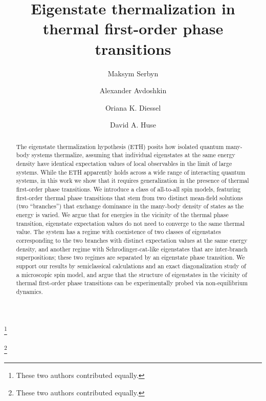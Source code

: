 \documentclass[aps,prx,showpacs,amsmath,amssymb,superscriptaddress,twocolumn,longbibliography,10pt,nofootinbib]{revtex4-2}
\begin{document}
  \title{Eigenstate thermalization in thermal first-order phase transitions}  
  \author{Maksym Serbyn}
  \thanks{These two authors contributed equally.}
\author{Alexander Avdoshkin}
\thanks{These two authors contributed equally.}
\author{Oriana K. Diessel}
\author{David A. Huse}
   \begin{abstract}
The eigenstate thermalization hypothesis (ETH) posits how isolated quantum many-body systems thermalize, assuming that individual eigenstates at the same energy density have identical expectation values of local observables in the limit of large systems. While the ETH apparently holds across a wide range of interacting quantum systems, in this work we show that it requires generalization in the presence of thermal first-order phase transitions. We introduce a class of all-to-all spin models, featuring first-order thermal phase transitions that stem from two distinct mean-field solutions (two ``branches'') that exchange dominance in the many-body density of states as the energy is varied.  We argue that for energies in the vicinity of the thermal phase transition, eigenstate expectation values do not need to converge to the same thermal value.  The system has a regime with coexistence of two classes of eigenstates corresponding to the two branches with distinct expectation values at the same energy density, and another regime with Schrodinger-cat-like eigenstates that are inter-branch superpositions; these two regimes are separated by an eigenstate phase transition. We support our results by semiclassical calculations and an exact diagonalization study of a microscopic spin model, and  argue that the structure of eigenstates in the vicinity of thermal first-order phase transitions can be experimentally probed via non-equilibrium dynamics.
\end{abstract}
\maketitle
\end{document}
